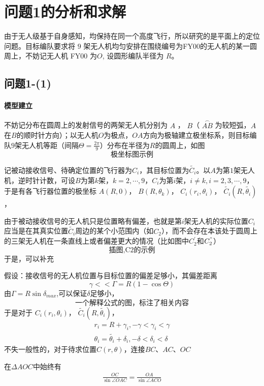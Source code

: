 \documentclass[UTF8]{ctexart}
\begin{document}
\section{问题1的分析和求解}
由于无人级基于自身感知，均保持在同一个高度飞行，所以研究的是平面上的定位问题。目标编队要求将 \(9\) 架无人机均匀安排在围绕编号为FY00的无人机的某一圆周上，不妨记无人机 FY00 为\(O\), 设圆形编队半径为 \(R\)。

\subsection{问题1-(1)}
\paragraph{模型建立}

不妨记分布在圆周上的发射信号的两架无人机分别为 \(A\) ， \(B\)（ \(\overset{\frown}{AB}\) 为较短弧，\(A\)在\(B\)的顺时针方向）；以无人机\(O\)为极点，\(OA\)方向为极轴建立极坐标系，则目标编队\(9\)架无人机等距（间隔\(\Theta=\frac{2\pi}{9}\)）分布在半径为\(R\)的圆周上，如图 \[\text{极坐标图示例}\]

记被动接收信号、待确定位置的飞行器为\(C_i\)，其目标位置为\(\tilde{C_i}\)。以\(A\)为第\(1\)架无人机，逆时针计数，可设\(B\)为第\(k\)架，\(k=2,\cdots,9\)，\(C_i\)为第\(i\)架，\(i\neq k,i = 2,3,\cdots,9\)，于是有各飞行器位置的极坐标
\(A(R,0)\)，
\(B(R,\theta_k)\)，
\(C_i(r_i,\theta_i)\)，
\(\tilde{C_i}(R,\tilde{\theta_i})\)，

由于被动接收信号的无人机只是位置略有偏差，也就是第\(i\)架无人机的实际位置\(C_i\)应当是在其真实位置\(\tilde{C_i}\)周边的某个小范围内（如\(C_2\)），而不会存在本该处于圆周上的三架无人机在一条直线上或者偏差更大的情况（比如图中\(C^{'}_2\)和\(C^{"}_2\)）\[\text{插图,C2的示例}\]于是，可以补充

假设：接收信号的无人机位置与目标位置的偏差足够小，其偏差距离 \[\gamma <<\Gamma= R(1-\cos\Theta)\]
由\(\Gamma = R\sin\delta_{max}\),可以保证\(\delta\)足够小，
\[\text{一个解释公式的图，标注了相关内容}\]
于是对于
\(C_i(r_i,\theta_i)\)，
\(\tilde{C_i}(R,\tilde{\theta_i})\)，
\begin{align}
    r_i = R + \gamma_i, -\gamma <\gamma_i < \gamma \label{r_i} \\
    \theta_i = \tilde{\theta_i} + \delta_i, - \delta < \delta_i < \delta
\end{align}
不失一般性的，对于待求位置\(C(r,\theta)\)，连接\(BC\)、\(AC\)、\(OC\)

在\(\Delta AOC\)中始终有
\begin{align}
    \frac{OC}{\sin{\angle OAC}} = \frac{OA}{\sin\angle ACO}
\end{align}
\end{document}
